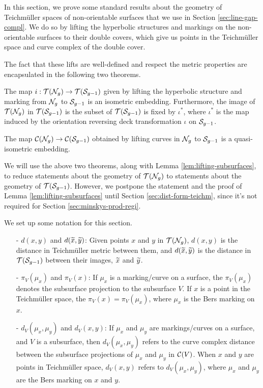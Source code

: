 \documentclass[12pt, reqno]{amsart}
\begin{document}
In this section, we prove some standard results about the geometry of Teichmüller spaces of non-orientable surfaces that we use in Section \ref{sec:line-gap-compl}.
We do so by lifting the hyperbolic structures and markings on the non-orientable surfaces to their double covers, which give us points in the Teichmüller space and curve complex of the double cover.

The fact that these lifts are well-defined and respect the metric properties are encapsulated in the following two theorems.

\begin{theorem}
  \label{thm:i-embedding-teich-space}
  The map $i : \mathcal{T}(\mathcal{N}_g) \to \mathcal{T}(\mathcal{S}_{g-1})$ given by lifting the hyperbolic structure and marking from $\mathcal{N}_g$ to $\mathcal{S}_{g-1}$ is an isometric embedding.
  Furthermore, the image of $\mathcal{T}(\mathcal{N}_g)$ in $\mathcal{T}(\mathcal{S}_{g-1})$ is the subset of $\mathcal{T}(\mathcal{S}_{g-1})$ is fixed by $\iota^{\ast}$, where $\iota^{\ast}$ is the map induced by the orientation reversing deck transformation $\iota$ on $\mathcal{S}_{g-1}$.
\end{theorem}

\begin{theorem}
  \label{thm:qi-embedding-curve-complex}
  The map $\mathcal{C}(\mathcal{N}_g) \to \mathcal{C}(\mathcal{S}_{g-1})$ obtained by lifting curves in $\mathcal{N}_g$ to $\mathcal{S}_{g-1}$ is a quasi-isometric embedding.
\end{theorem}

We will use the above two theorems, along with Lemma \ref{lem:lifting-subsurfaces}, to reduce statements about the geometry of $\mathcal{T}(\mathcal{N}_g)$ to statements about the geometry of $\mathcal{T}(\mathcal{S}_{g-1})$.
However, we postpone the statement and the proof of Lemma \ref{lem:lifting-subsurfaces} until Section \ref{sec:dist-form-teichm}, since it's not required for Section \ref{sec:minskys-prod-regi}.

We set up some notation for this section.
\begin{itemize}
\item[-] $d(x,y)$ and $d(\widetilde{x}, \widetilde{y})$: Given points $x$ and $y$ in $\mathcal{T}(\mathcal{N}_g)$, $d(x, y)$ is the distance in Teichmüller metric between them, and $d(\widetilde{x}, \widetilde{y})$ is the distance in $\mathcal{T}(\mathcal{S}_{g-1})$ between their images, $\widetilde{x}$ and $\widetilde{y}$.
\item[-] $\pi_V(\mu_x)$ and $\pi_V(x)$: If $\mu_x$ is a marking/curve on a surface, the $\pi_V(\mu_x)$ denotes the subsurface projection to the subsurface $V$. If $x$ is a point in the Teichmüller space, the $\pi_V(x) = \pi_V(\mu_x)$, where $\mu_x$ is the Bers marking on $x$.
\item[-] $d_V(\mu_x, \mu_y)$ and $d_V(x, y)$: If $\mu_x$ and $\mu_y$ are markings/curves on a surface, and $V$ is a subsurface, then $d_V(\mu_x, \mu_y)$ refers to the curve complex distance between the subsurface projections of $\mu_x$ and $\mu_y$ in $\mathcal{C}(V)$.
  When $x$ and $y$ are points in Teichmüller space, $d_V(x,y)$ refers to $d_V(\mu_x, \mu_y)$, where $\mu_x$ and $\mu_y$ are the Bers marking on $x$ and $y$.
\end{itemize}
\end{document}
